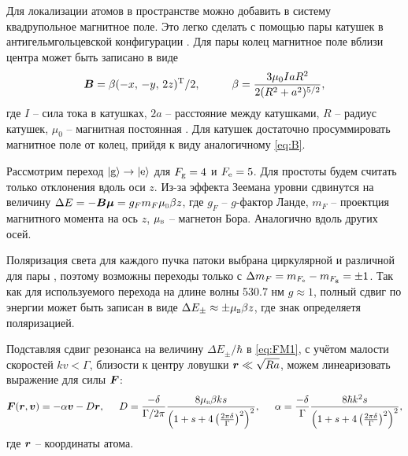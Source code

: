 Для локализации атомов в пространстве можно добавить в систему квадрупольное магнитное поле. Это легко сделать с помощью пары катушек в антигельмгольцевской конфигурации \cite{PhysRevA83}. Для пары колец магнитное поле вблизи центра может быть записано в виде
\begin{equation}
	\vc{B} = \beta (-x,\,  -y,\, 2z)\T/2,
	\hspace{10 mm} 
	\beta = \frac{3 \mu_0 I a R^2}{2(R^2+a^2)^{5/2}},
	\label{eq:B}
\end{equation}
где $I$ -- сила тока в катушках, $2a$ -- расстояние между катушками, $R$ -- радиус катушек, $\mu_0$ -- магнитная постоянная \cite{PhysRevA83}. Для катушек достаточно просуммировать магнитное поле от колец, прийдя к виду аналогичному \eqref{eq:B}. 

Рассмотрим переход $\left| \text{g} \right\rangle \to \left| \text{e} \right\rangle$ для $F_{\textnormal{g}} = 4$ и $F_{\textnormal{e}} = 5$. Для простоты будем считать только отклонения вдоль оси $z$. Из-за эффекта Зеемана уровни сдвинутся на величину $\Delta E = - \vc{B} \vc{\mu} = g_F m_F \subt{\mu}{B} \beta z$, где $g_F$ -- $g$-фактор Ланде, $m_F$ -- проектция магнитного момента на ось $z$, $\subt{\mu}{B}$ -- магнетон Бора. Аналогично вдоль других осей.

Поляризация света для каждого пучка патоки выбрана циркулярной и различной для пары \cite{vlad}, поэтому возможны переходы только с  $\Delta m_F = m_{F_{\textnormal{e}}}-m_{F_{\textnormal{g}}}= \pm 1$. Так как для используемого перехода на длине волны 530.7 нм $g \approx 1$, полный сдвиг по энергии может быть записан в виде $\Delta E_{\pm} \approx \pm \subt{\mu}{B} \beta z$, где знак определяетя поляризацией. 

Подставляя сдвиг резонанса на величину $\Delta E_{\pm} / \hbar$ в \eqref{eq:FM1}, с учётом малости скоростей $k v < \Gamma$, близости к центру ловушки $\boldsymbol{r} \ll \sqrt{R a}$, можем линеаризовать выражение для силы $\boldsymbol{F}$:
\begin{equation}
	\vc{F}(\vc{r}, \vc{v}) = -\alpha \vc{v} - D \vc{r},
	\hspace{5 mm} 
	D = \frac{-\delta}{\Gamma/2\pi}\frac{8 \subt{\mu}{B} \beta k s}{\left(1+s+4\left(\frac{2\pi \delta}{\Gamma}\right)^2\right)^2},
	\hspace{5 mm} 
	\alpha = \frac{-\delta}{\Gamma} \frac{8 \hbar k^2 s}{\left(1+s+4\left(\frac{2\pi \delta}{\Gamma}\right)^2\right)^2},
\end{equation}
где $\boldsymbol{r}$  -- координаты атома.











